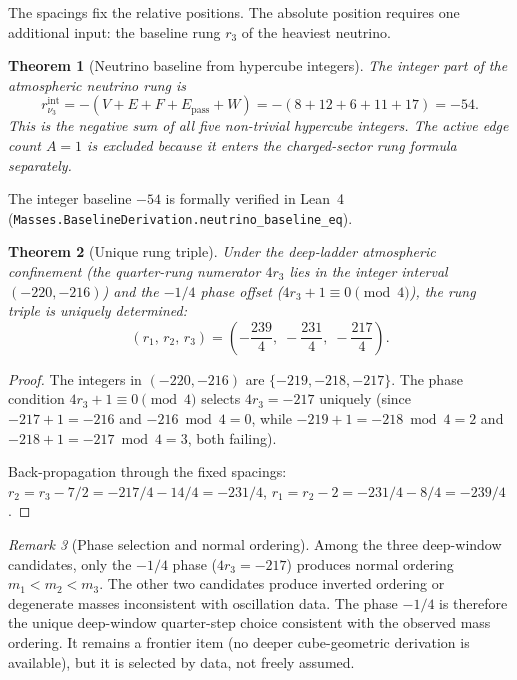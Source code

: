 \documentclass[11pt]{article}
\newtheorem{theorem}{Theorem}
\theoremstyle{remark}
\newtheorem{remark}[theorem]{Remark}
\newcommand{\Epass}{E_{\mathrm{pass}}}
\begin{document}
The spacings fix the relative positions.  The absolute position
requires one additional input: the baseline rung $r_3$ of the
heaviest neutrino.

\begin{theorem}[Neutrino baseline from hypercube integers]
\label{thm:baseline}
The integer part of the atmospheric neutrino rung is
\begin{equation}\label{eq:baseline}
  r_{\nu_3}^{\mathrm{int}}
  = -(V+E+F+\Epass+W)
  = -(8+12+6+11+17) = -54.
\end{equation}
This is the negative sum of all five non-trivial hypercube
integers.  The active edge count $A=1$ is excluded because it
enters the charged-sector rung formula separately.
\end{theorem}

The integer baseline $-54$ is formally verified in Lean~4
(\texttt{Masses.BaselineDerivation.neutrino\_baseline\_eq}).

\begin{theorem}[Unique rung triple]
\label{thm:triple}
Under the deep-ladder atmospheric confinement (the quarter-rung
numerator $4r_3$ lies in the integer interval $(-220,-216)$) and
the $-1/4$ phase offset ($4r_3+1\equiv 0\pmod{4}$), the rung
triple is uniquely determined:
\begin{equation}\label{eq:triple}
  (r_1,\,r_2,\,r_3)
  = \left(-\frac{239}{4},\;-\frac{231}{4},\;-\frac{217}{4}\right).
\end{equation}
\end{theorem}

\begin{proof}
The integers in $(-220,-216)$ are $\{-219,-218,-217\}$.  The
phase condition $4r_3+1\equiv 0\pmod{4}$ selects $4r_3=-217$
uniquely (since $-217+1=-216$ and $-216\bmod 4=0$, while
$-219+1=-218\bmod 4=2$ and $-218+1=-217\bmod 4=3$, both
failing).

Back-propagation through the fixed spacings:
$r_2 = r_3 - 7/2 = -217/4 - 14/4 = -231/4$,\;
$r_1 = r_2 - 2 = -231/4 - 8/4 = -239/4$.
\end{proof}

\begin{remark}[Phase selection and normal ordering]
Among the three deep-window candidates, only the $-1/4$ phase
($4r_3=-217$) produces normal ordering $m_1<m_2<m_3$.  The
other two candidates produce inverted ordering or degenerate
masses inconsistent with oscillation data.  The phase $-1/4$ is
therefore the unique deep-window quarter-step choice consistent
with the observed mass ordering.  It remains a frontier item
(no deeper cube-geometric derivation is available), but it is
selected by data, not freely assumed.
\end{remark}
\end{document}
